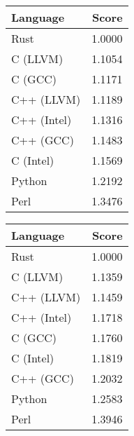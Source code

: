\begin{subtable}{0.33\textwidth}
    \centering
    \caption{$k=1$}
    \label{table:energy:dfa_gap(1)}
    \begin{tabular}{|l|r|}
        \hline
        Language & Score \\
        \hline
        Rust & 1.0000 \\
        C (LLVM) & 1.1054 \\
        C (GCC) & 1.1171 \\
        C++ (LLVM) & 1.1189 \\
        C++ (Intel) & 1.1316 \\
        C++ (GCC) & 1.1483 \\
        C (Intel) & 1.1569 \\
        Python & 1.2192 \\
        Perl & 1.3476 \\
        \hline
    \end{tabular}
\end{subtable}%
\begin{subtable}{0.33\textwidth}
    \centering
    \caption{$k=2$}
    \label{table:energy:dfa_gap(2)}
    \begin{tabular}{|l|r|}
        \hline
        Language & Score \\
        \hline
        Rust & 1.0000 \\
        C (LLVM) & 1.1359 \\
        C++ (LLVM) & 1.1459 \\
        C++ (Intel) & 1.1718 \\
        C (GCC) & 1.1760 \\
        C (Intel) & 1.1819 \\
        C++ (GCC) & 1.2032 \\
        Python & 1.2583 \\
        Perl & 1.3946 \\
        \hline
    \end{tabular}
\end{subtable}%
